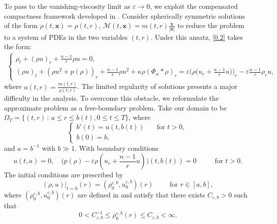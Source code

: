 \documentclass[reqno,11pt]{amsart}
\numberwithin{equation}{section}
\theoremstyle{definition}
\def\v{\varepsilon}
\begin{document}
To pass to the vanishing-viscosity limit as $\v \to 0$, 
we exploit the compensated compactness framework developed 
in \cite{Schrecker_2019,Chen_2024}.
Consider spherically symmetric solutions of the form
$\rho(t,\boldsymbol{x}) = \rho(t,r)$, $\mathcal{M}(t,\boldsymbol{x}) = m(t,r) \frac{\boldsymbol{x}}{|\boldsymbol{x}|}$ to reduce
the problem to a system of PDEs in the two variables $(t,r)$.
Under this ansatz, \eqref{0.2} takes the form:
\begin{align}\label{Eul}
    \begin{cases}
 \displaystyle
  \rho_t + (\rho u)_r + \frac{n-1}{r}\rho u = 0, \\
 \displaystyle
 (\rho u )_t + (\rho u^2 + p(\rho))_r + \frac{n-1}{r}\rho u^2 + \kappa \rho(\Phi_{\alpha} * \rho)_r = \varepsilon\Big( \rho \big (u_r + \frac{n-1}{r}u \big ) \Big)_r - \varepsilon\frac{n-1}{r}\rho_ru,
    \end{cases}
    \end{align}
 where $u(t,r) = \frac{m(t,r)}{\rho(t,r)}$. 
The limited regularity of solutions presents a major difficulty in the analysis.
To overcome this obstacle, we reformulate the approximate problem as a free-boundary problem. Take our domain to be 
$\Omega_T = \{(t,r) \, :\, a \leq r \leq b(t),  0 \leq t \leq T\}$, where
    \begin{equation}\label{1.16}
    \begin{cases}
      b' (t) = u(t,b(t)) &\quad \mbox{for $t>0$}, \\
      b(0) = b,
    \end{cases}
    \end{equation}
    and $a = b^{-1}$ with $b \gg 1$. With boundary conditions
    \begin{equation}\label{boundary}
    u(t,a) = 0, \quad \big ( p(\rho) - \varepsilon \rho (u_r + \frac{n-1}{r}u) \big)(t,b(t)) = 0  \qquad\,\, \text{ for } t >0.
    \end{equation}
    The initial conditions are prescribed by
    \begin{equation}\label{1.17}
 (\rho,u)|_{t=0}(r) = (\rho_0^{\v,b},u_0^{\v,b})(r) \qquad \text{ for } r \in [a,b],
    \end{equation}
    where $(\rho_0^{\v,b},u_0^{\v,b})(r)$ are defined in \cite[Appendix B]{Carrillo2025} and satisfy that there exists $C_{\v,b} > 0$ such that
    \begin{equation}\label{1.18}
  0 < C_{\v,b}^{-1} \leq \rho_0^{\v,b}(r) \leq C_{\v,b} < \infty.
    \end{equation}
\end{document}
